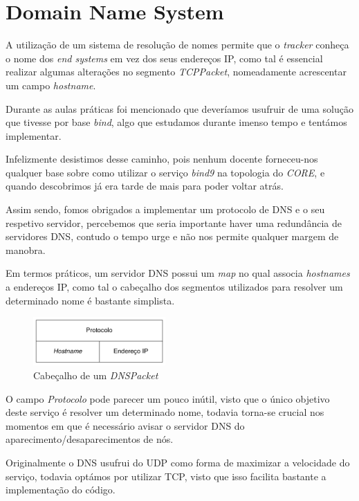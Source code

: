 \section{Domain Name System}

    A utilização de um sistema de resolução de nomes permite que o \textit{tracker} conheça o nome dos \textit{end systems} em vez dos seus endereços IP, como tal é essencial realizar algumas alterações no segmento \textit{TCPPacket}, nomeadamente acrescentar um campo \textit{hostname}.

    Durante as aulas práticas foi mencionado que deveríamos usufruir de uma solução que tivesse por base \textit{bind}, algo que estudamos durante imenso tempo e tentámos implementar.

    Infelizmente desistimos desse caminho, pois nenhum docente forneceu-nos qualquer base sobre como utilizar o serviço \textit{bind9} na topologia do \textit{CORE}, e quando descobrimos já era tarde de mais para poder voltar atrás.

    Assim sendo, fomos obrigados a implementar um protocolo de DNS e o seu respetivo servidor, percebemos que seria importante haver uma redundância de servidores DNS, contudo o tempo urge e não nos permite qualquer margem de manobra.

    Em termos práticos, um servidor DNS possui um \textit{map} no qual associa \textit{hostnames} a endereços IP, como tal o cabeçalho dos segmentos utilizados para resolver um determinado nome é bastante simplista.

    \newpage
    \begin{figure}[hb!]
        \centering
        \includegraphics[width=0.45\textwidth]{Imagens/Headers/dns.png}
        \caption{Cabeçalho de um \textit{DNSPacket}}
    \end{figure}

    O campo \textit{Protocolo} pode parecer um pouco inútil, visto que o único objetivo deste serviço é resolver um determinado nome, todavia torna-se crucial nos momentos em que é necessário avisar o servidor DNS do aparecimento/desaparecimentos de nós.

    Originalmente o DNS usufrui do UDP como forma de maximizar a velocidade do serviço, todavia optámos por utilizar TCP, visto que isso facilita bastante a implementação do código.

